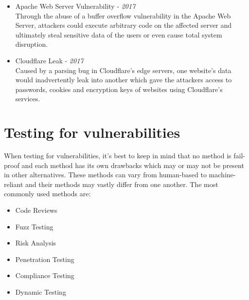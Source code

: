 \begin{itemize}

    \item Apache Web Server Vulnerability - \textit{2017} \cite{kim2017vuddy} \\
    Through the abuse of a buffer overflow vulnerability in the Apache Web Server, attackers could execute arbitrary code on the affected server and ultimately steal sensitive data of the users or even cause total system disruption.

    \item Cloudflare Leak - \textit{2017} \cite{baisakhiya2017cloud} \\
    Caused by a parsing bug in Cloudflare's edge servers, one website's data would inadvertently leak into another which gave the attackers access to passwords, cookies and encryption keys of websites using Cloudflare's services.

    
\end{itemize}





\section{Testing for vulnerabilities}
When testing for vulnerabilities, it's best to keep in mind that no method is fail-proof and each method has its own drawbacks which may or may not be present in other alternatives. These methods can vary from human-based to machine-reliant and their methods may vastly differ from one another. The most commonly used methods are: \cite{al2013survey}

\begin{multicols}{2}
\begin{itemize}
    \item Code Reviews
    \item Fuzz Testing
    \item Risk Analysis
    \item Penetration Testing
    \item Compliance Testing
    \item Dynamic Testing
\end{itemize}
\end{multicols}

